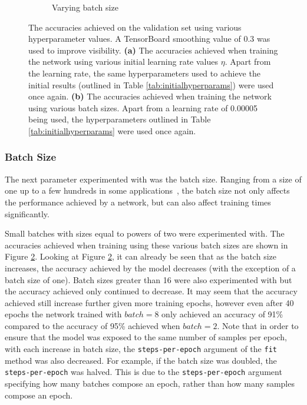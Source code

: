 \begin{figure}[!t]
\begin{subfigure}[b]{0.49\textwidth}
        \caption{Varying batch size}
        \label{fig:bsplot}
    \end{subfigure}
    \caption{The accuracies achieved on the validation set using various hyperparameter values. A TensorBoard smoothing value of 0.3 was used to improve visibility. \textbf{(a)} The accuracies achieved when training the network using various initial learning rate values $\eta$. Apart from the learning rate, the same hyperparameters used to achieve the initial results (outlined in Table \ref{tab:initialhyperparams}) were used once again. \textbf{(b)} The accuracies achieved when training the network using various batch sizes. Apart from a learning rate of 0.00005 being used, the hyperparameters outlined in Table \ref{tab:initialhyperparams} were used once again.}
\end{figure}

\subsubsection{Batch Size}

The next parameter experimented with was the batch size. Ranging from a size of one up to a few hundreds in some applications~\cite{bengio2012practical}, the batch size not only affects the performance achieved by a network, but can also affect training times significantly.

Small batches with sizes equal to powers of two were experimented with. The accuracies achieved when training using these various batch sizes are shown in Figure \ref{fig:bsplot}. Looking at Figure \ref{fig:bsplot}, it can already be seen that as the batch size increases, the accuracy achieved by the model decreases (with the exception of a batch size of one). Batch sizes greater than 16 were also experimented with but the accuracy achieved only continued to decrease. It may seem that the accuracy achieved still increase further given more training epochs, however even after 40 epochs the network trained with $batch=8$ only achieved an accuracy of 91\% compared to the accuracy of 95\% achieved when $batch=2$. Note that in order to ensure that the model was exposed to the same number of samples per epoch, with each increase in batch size, the \texttt{steps-per-epoch} argument of the \texttt{fit} method was also decreased. For example, if the batch size was doubled, the \texttt{steps-per-epoch} was halved. This is due to the \texttt{steps-per-epoch} argument specifying how many batches compose an epoch, rather than how many samples compose an epoch.

